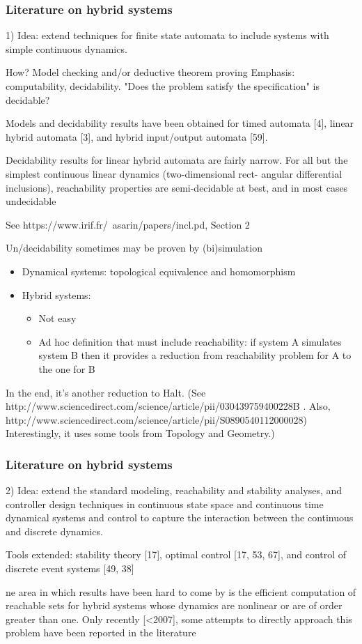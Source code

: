 \begin{frame}
	\frametitle{Literature on hybrid systems}
	 1) Idea: extend techniques for finite state automata to include systems with simple continuous dynamics.
	 
	 How? Model checking and/or deductive theorem proving
	 Emphasis: computability, decidability. "Does the problem satisfy the specification" is decidable?
	 
	Models and decidability
results have been obtained for timed automata [4], linear hybrid automata [3], and hybrid
input/output automata [59]. 

Decidability results for linear hybrid automata are
fairly narrow.  For all but the simplest continuous linear dynamics (two-dimensional rect-
angular differential inclusions), reachability properties are semi-decidable at best, and in
most cases undecidable	 
	 
	 See https://www.irif.fr/~asarin/papers/incl.pd, Section 2
\end{frame}


\begin{frame}

Un/decidability sometimes may be proven by (bi)simulation

\begin{itemize}
	\item Dynamical systems: topological equivalence and homomorphism
	\item Hybrid systems:
		\begin{itemize}
			\item Not easy
			\item Ad hoc definition that must include reachability: if system A simulates system B then it provides a reduction from reachability problem for A to the one for B
		\end{itemize}
\end{itemize}

In the end, it's another reduction to Halt. 
(See http://www.sciencedirect.com/science/article/pii/030439759400228B
. Also, http://www.sciencedirect.com/science/article/pii/S0890540112000028)
Interestingly, it uses some tools from Topology and Geometry.)\end{frame}


\begin{frame}
	\frametitle{Literature on hybrid systems}
	 2) Idea:  extend the standard modeling, reachability and stability
analyses, and controller design techniques in continuous state space and continuous time dynamical systems and control to capture the interaction between the continuous
and discrete dynamics.


Tools extended:  stability theory [17], optimal control [17, 53, 67], and control of
discrete event systems [49, 38]

ne area in which results have been hard
to come by is the efficient
computation
of reachable sets for hybrid systems whose dynamics
are nonlinear or are of order greater than one.  Only recently [<2007], some attempts to directly
approach this problem have been reported in the literature 
\end{frame}


